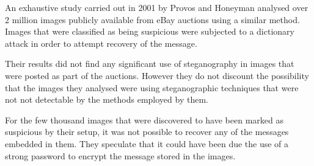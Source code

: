An exhaustive study carried out in 2001 by Provos and Honeyman \cite{provos2001detecting} analysed over 2 million images publicly available from eBay auctions using a similar method. Images that were classified as being suspicious were subjected to a dictionary attack in order to attempt recovery of the message.
\par Their results did not find any significant use of steganography in images that were posted as part of the auctions. However they do not discount the possibility that the images they analysed were using steganographic techniques that were not not detectable by the methods employed by them.
\par For the few thousand images that were discovered to have been marked as suspicious by their setup, it was not possible to recover any of the messages embedded in them.  They speculate that it could have been due the use of a strong password to encrypt the message stored in the images.


